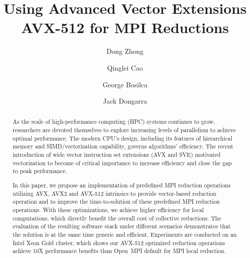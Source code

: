 \documentclass[5p,times,twocolumn]{elsarticle}
\newcommand{\ompi}[0]{Open~MPI\xspace}
\begin{document}
\title{Using Advanced Vector Extensions AVX-512 for MPI Reductions}

\author[First]{Dong Zhong}

\author[First]{Qinglei Cao}

\author[First]{George Bosilca}

\author[First]{Jack Dongarra}

\address[First]{The University of Tennessee, 1122 Volunteer Blvd, knoxville, TN 37996}

\begin{abstract}
  As the scale of high-performance computing (HPC) systems continues to grow, researchers are devoted themselves to explore increasing levels of parallelism to achieve optimal performance.
  The modern CPU's design, including its features of hierarchical
  memory and SIMD/vectorization capability, governs algorithms'
  efficiency. The recent introduction of wide vector instruction
  set extensions (AVX and SVE) motivated vectorization to become of
  critical importance to increase efficiency and close the gap to peak
  performance.

  In this paper, we propose an implementation of predefined MPI
  reduction operations utilizing AVX, AVX2 and AVX-512 intrinsics to
  provide vector-based reduction operation and to improve the
  time-to-solution of these predefined MPI reduction operations.  With
  these optimizations, we achieve higher efficiency for local
  computations, which directly benefit the overall cost of collective
  reductions.
%
  The evaluation of the resulting software stack under different
  scenarios demonstrates that the solution is at the same time generic
  and efficient.  Experiments are conducted on an Intel Xeon Gold
  cluster, which shows our AVX-512 optimized reduction operations
  achieve 10X performance benefits than \ompi default for MPI local
  reduction.
%
\end{abstract}
\end{document}
